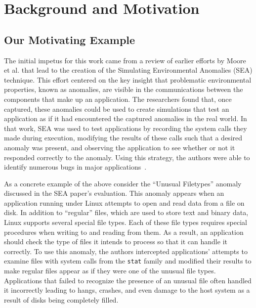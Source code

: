 
\section{Background and Motivation}
\label{SEC:background}


\subsection{Our Motivating Example}
\label{sec:MotivatingExample}

The initial impetus for this work came from a review
of earlier efforts by Moore et al.
that lead to the creation of
the Simulating Environmental Anomalies (SEA) technique.
This effort centered on the key insight
that problematic
environmental properties,
known as anomalies, are visible in the
communications between the components that make up an application.
The researchers found that,
once captured,
these anomalies
could be
used to create simulations
that test
an application as if
it had encountered the captured anomalies
in the real world.
In that work, SEA was used to test applications
by recording the system calls they made
during execution,
modifying the results of these calls such that a desired anomaly
was present,
and observing the application to see whether or not it
responded correctly to the anomaly.
Using this strategy, the authors were able to identify numerous bugs
in major applications~\cite{crashsim}.

As a concrete example of the above
consider the ``Unusual Filetypes'' anomaly
discussed in the SEA paper's evaluation.
This anomaly appears
when an application running under Linux
attempts to open and read data from a file on disk.
In addition to ``regular'' files,
which are used to store text and
binary data,
Linux supports several special file types.
Each of these file types requires special procedures when writing to and
reading from them.
As a result, an application should check the type of files it intends to
process so that it can handle it correctly.
To use this anomaly, the authors intercepted applications' attempts to
examine files with system calls from the {\tt stat} family and modified
their results to make regular files appear as if they were one of the
unusual file types.
Applications that failed to recognize the presence of
an unusual file often handled it incorrectly leading to hangs,
crashes, and even damage to the host system as a result of disks being
completely filled.

